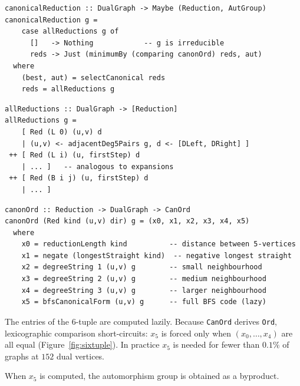 \documentclass[11pt,a4paper]{article}
\theoremstyle{definition}
\begin{document}
\begin{lstlisting}
canonicalReduction :: DualGraph -> Maybe (Reduction, AutGroup)
canonicalReduction g =
    case allReductions g of
      []   -> Nothing            -- g is irreducible
      reds -> Just (minimumBy (comparing canonOrd) reds, aut)
  where
    (best, aut) = selectCanonical reds
    reds = allReductions g
\end{lstlisting}

\begin{lstlisting}
allReductions :: DualGraph -> [Reduction]
allReductions g =
    [ Red (L 0) (u,v) d
    | (u,v) <- adjacentDeg5Pairs g, d <- [DLeft, DRight] ]
 ++ [ Red (L i) (u, firstStep) d
    | ... ]   -- analogous to expansions
 ++ [ Red (B i j) (u, firstStep) d
    | ... ]
\end{lstlisting}

\begin{lstlisting}
canonOrd :: Reduction -> DualGraph -> CanOrd
canonOrd (Red kind (u,v) dir) g = (x0, x1, x2, x3, x4, x5)
  where
    x0 = reductionLength kind          -- distance between 5-vertices
    x1 = negate (longestStraight kind)  -- negative longest straight
    x2 = degreeString 1 (u,v) g        -- small neighbourhood
    x3 = degreeString 2 (u,v) g        -- medium neighbourhood
    x4 = degreeString 3 (u,v) g        -- larger neighbourhood
    x5 = bfsCanonicalForm (u,v) g      -- full BFS code (lazy)
\end{lstlisting}

The entries of the 6-tuple are computed lazily.  Because
\texttt{CanOrd} derives \texttt{Ord}, lexicographic comparison
short-circuits: $x_5$ is forced only when $(x_0, \ldots, x_4)$ are
all equal (Figure~\ref{fig:sixtuple}).  In practice $x_5$ is needed
for fewer than $0.1\%$ of graphs at $152$ dual vertices.

When $x_5$ is computed, the automorphism group is obtained as a
byproduct.
\end{document}
